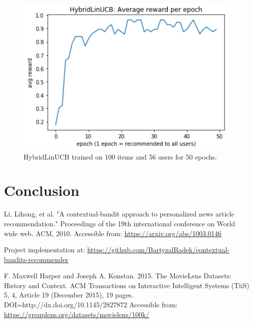 \documentclass[12pt, titlepage]{article}
\begin{document}
\begin{figure}[h!]
 \centering
 \includegraphics[scale=0.5]{img/HybridLinUCB-100items-50epochs}
 \caption{HybridLinUCB trained on 100 items and 56 users for 50 epochs. }
 \label{fig:HybridlinUCB-100it}
\end{figure}



\section{Conclusion}\label{sec:conclusion}


\begin{thebibliography}{0}

   Li, Lihong, et al. "A contextual-bandit approach to personalized news article recommendation." Proceedings of the 19th international conference on World wide web. ACM, 2010. Accessible from: \url{https://arxiv.org/abs/1003.0146}
  
   Project implementation at: \url{https://github.com/BartyzalRadek/contextual-bandits-recommender}
  
   F. Maxwell Harper and Joseph A. Konstan. 2015. The MovieLens Datasets:
History and Context. ACM Transactions on Interactive Intelligent
Systems (TiiS) 5, 4, Article 19 (December 2015), 19 pages.
DOI=http://dx.doi.org/10.1145/2827872 Accessible from: \url{https://grouplens.org/datasets/movielens/100k/}



\end{thebibliography}
\end{document}
